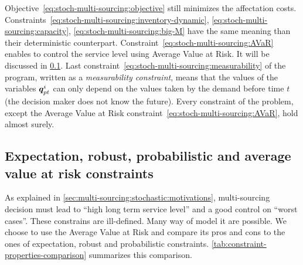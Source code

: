 Objective~\eqref{eq:stoch-multi-sourcing:objective} still minimizes the affectation costs.
Constraints~\eqref{eq:stoch-multi-sourcing:inventory-dynamic}, \eqref{eq:stoch-multi-sourcing:capacity}, \eqref{eq:stoch-multi-sourcing:big-M} have the same meaning than their deterministic counterpart.
Constraint~\eqref{eq:stoch-multi-sourcing:AVaR} enables to control the service level using Average Value at Risk.
It will be discussed in \cref{sec:multi-sourcing:stochastic:model:discussion}.
Last constraint~\eqref{eq:stoch-multi-sourcing:measurability} of the program, written as a {\em measurability constraint}, means that the values of the variables $\va\quantity_{pt}^i$ can only depend on the values taken by the demand before time $t$ (the decision maker does not know the future).
Every constraint of the problem, except the Average Value at Risk constraint~\eqref{eq:stoch-multi-sourcing:AVaR}, hold almost surely.


\subsection{Expectation, robust, probabilistic and average value at risk constraints}
\label{sec:multi-sourcing:stochastic:model:discussion}


As explained in \cref{sec:multi-sourcing:stochastic:motivations}, multi-sourcing decision must lead to ``high long term service level'' and a good control on ``worst cases''.
These constrains are ill-defined.
Many way of model it are possible.
We choose to use the Average Value at Risk and compare its pros and cons to the ones of expectation, robust and probabilistic constraints.
\cref{tab:constraint-properties-comparison} summarizes this comparison.


